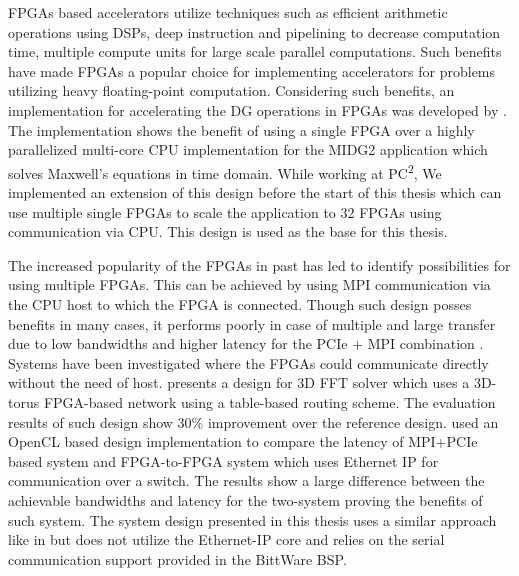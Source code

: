 FPGAs based accelerators utilize techniques such as efficient arithmetic operations using DSPs,
deep instruction and pipelining to decrease computation time, multiple compute units for
large scale parallel computations.
Such benefits have made FPGAs a popular choice for implementing accelerators for
problems utilizing heavy floating-point computation. Considering such benefits,
an implementation for accelerating the \ac{DG} operations in FPGAs was
developed by \textcite{kenter_opencl-based_2018}. The implementation shows the benefit
of using a single FPGA over a highly parallelized multi-core CPU implementation for
the MIDG2 application which solves Maxwell’s equations in time domain. While working at
PC\textsuperscript{2}, We implemented an extension of this design before the start of this thesis
which can use multiple single FPGAs to scale the application to 32 FPGAs using
communication via CPU. This design is used as the base for this thesis.

The increased popularity of the FPGAs in past has led to identify possibilities for
using multiple FPGAs. This can be achieved by using \ac{MPI} communication via the CPU host
to which the FPGA is connected. Though such design posses benefits in many cases,
it performs poorly in case of multiple and large transfer due to low bandwidths
and higher latency for the PCIe + \ac{MPI} combination \cite{kobayashi_opencl-ready_2018}.
Systems have been investigated where the FPGAs could
communicate directly without the need of host. \textcite{sheng_hpc_2017} presents a design
for 3D FFT solver which uses a 3D-torus FPGA-based network using a table-based routing
scheme. The evaluation results of such design show 30\% improvement over the reference design.
\textcite{kobayashi_opencl-ready_2018} used an OpenCL based design implementation to
compare the latency of \ac{MPI}+PCIe based system and FPGA-to-FPGA system which uses Ethernet
IP for communication over a switch. The results show a large difference between the achievable
bandwidths and latency for the two-system proving the benefits of such system. The system
design presented in this thesis uses a similar approach like in \cite{kobayashi_opencl-ready_2018}
but does not utilize the Ethernet-IP core and relies on the serial communication
support provided in the BittWare BSP.

